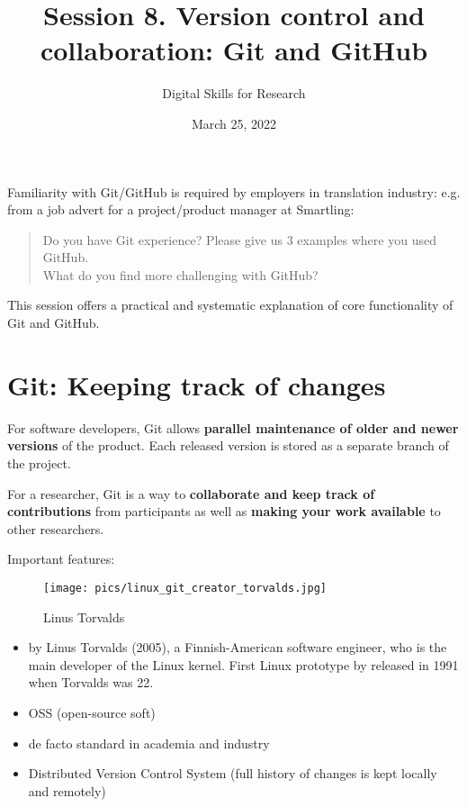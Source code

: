\documentclass[a4paper,11pt]{article}
\title{Session 8. Version control and collaboration: Git and GitHub}
\author{Digital Skills for Research}
\date{March 25, 2022}
\begin{document}
	
	\clearpage
	\maketitle
	\thispagestyle{empty}
	
	\tableofcontents 

\section*{}

Familiarity with Git/GitHub is required by employers in translation industry:
e.g. from a job advert for a project/product manager at Smartling:
\begin{quotation}
	\noindent Do you have Git experience? Please give us 3 examples where you used GitHub.\\
	What do you find more challenging with GitHub?
\end{quotation}

This session offers a practical and systematic explanation of core functionality of Git and GitHub. \\	

\section{Git: Keeping track of changes}

For software developers, Git allows \textbf{parallel maintenance of older and newer versions} of the product. Each released version is stored as a separate branch of the project. 

For a researcher, Git is a way to \textbf{collaborate and keep track of contributions} from participants as well as \textbf{making your work available} to other researchers. 

\bigskip

Important features:
\begin{wrapfigure}{r}{0.3333\textwidth}
	\centering
	\texttt{[image: pics/linux\_git\_creator\_torvalds.jpg]}
	\caption{Linus Torvalds}
\end{wrapfigure}
\begin{itemize}
	\item by Linus Torvalds (2005), a Finnish-American software engineer, who is the main developer of the Linux kernel. First Linux prototype by released in 1991 when Torvalds was 22.
	\item OSS (open-source soft)
	\item de facto standard in academia and industry
	\item Distributed Version Control System (full history of changes is kept locally and remotely)	
\end{itemize}
\end{document}
